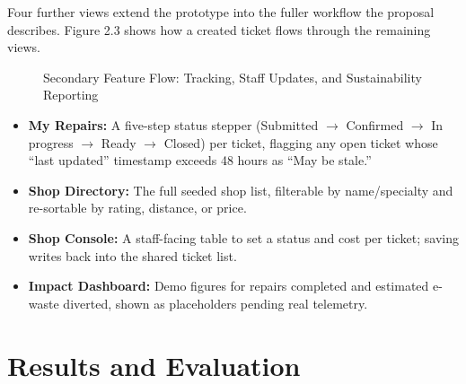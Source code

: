 \documentclass[11pt,a4paper]{report}
\begin{document}
Four further views extend the prototype into the fuller workflow the proposal describes. Figure 2.3 shows how a created ticket flows through the remaining views.

\begin{figure}[h!]
\centering
{}
\caption{Secondary Feature Flow: Tracking, Staff Updates, and Sustainability Reporting}
\end{figure}

\begin{itemize}
    \item \textbf{My Repairs:} A five-step status stepper (Submitted $\rightarrow$ Confirmed $\rightarrow$ In progress $\rightarrow$ Ready $\rightarrow$ Closed) per ticket, flagging any open ticket whose ``last updated'' timestamp exceeds 48 hours as ``May be stale.''
    \item \textbf{Shop Directory:} The full seeded shop list, filterable by name/specialty and re-sortable by rating, distance, or price.
    \item \textbf{Shop Console:} A staff-facing table to set a status and cost per ticket; saving writes back into the shared ticket list.
    \item \textbf{Impact Dashboard:} Demo figures for repairs completed and estimated e-waste diverted, shown as placeholders pending real telemetry.
\end{itemize}

\chapter{Results and Evaluation}
\end{document}
